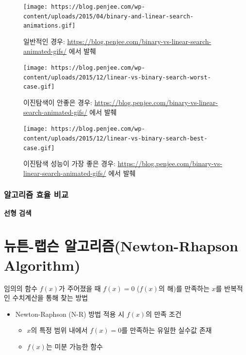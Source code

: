 \documentclass[
  11pt,
]{krantz}
\providecommand{\tightlist}{%
  \setlength{\itemsep}{0pt}\setlength{\parskip}{0pt}}
\begin{document}
\begin{figure}
\centering
\texttt{[image: https://blog.penjee.com/wp-content/uploads/2015/04/binary-and-linear-search-animations.gif]}
\caption{일반적인 경우: \url{https://blog.penjee.com/binary-vs-linear-search-animated-gifs/} 에서 발췌}
\end{figure}

\begin{figure}
\centering
\texttt{[image: https://blog.penjee.com/wp-content/uploads/2015/12/linear-vs-binary-search-worst-case.gif]}
\caption{이진탐색이 안좋은 경우: \url{https://blog.penjee.com/binary-vs-linear-search-animated-gifs/} 에서 발췌}
\end{figure}

\begin{figure}
\centering
\texttt{[image: https://blog.penjee.com/wp-content/uploads/2015/12/linear-vs-binary-search-best-case.gif]}
\caption{이진탐색 성능이 가장 좋은 경우: \url{https://blog.penjee.com/binary-vs-linear-search-animated-gifs/} 에서 발췌}
\end{figure}

\hypertarget{uxc54cuxace0uxb9acuxc998-uxd6a8uxc728-uxbe44uxad50}{%
\subsubsection{알고리즘 효율 비교}\label{uxc54cuxace0uxb9acuxc998-uxd6a8uxc728-uxbe44uxad50}}

\textbf{선형 검색}

\hypertarget{uxb274uxd2bc-uxb7a9uxc2a8-uxc54cuxace0uxb9acuxc998newton-rhapson-algorithm}{%
\section{뉴튼-랩슨 알고리즘(Newton-Rhapson Algorithm)}\label{uxb274uxd2bc-uxb7a9uxc2a8-uxc54cuxace0uxb9acuxc998newton-rhapson-algorithm}}

임의의 함수 \(f(x)\)가 주어졌을 때 \(f(x) = 0\) (\(f(x)\)의 해)를 만족하는 \(x\)를 반복적인 수치계산을 통해 찾는 방법

\begin{itemize}
\tightlist
\item
  Newton-Raphson (N-R) 방법 적용 시 \(f(x)\)의 만족 조건

  \begin{itemize}
  \tightlist
  \item
    \(x\)의 특정 범위 내에서 \(f(x) = 0\)를 만족하는 유일한 실수값 존재
  \item
    \(f(x)\)는 미분 가능한 함수
  \end{itemize}
\end{itemize}
\end{document}
